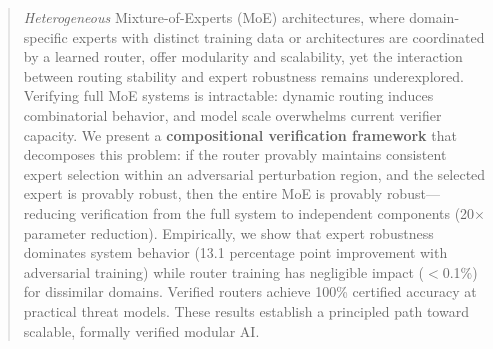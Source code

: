 \documentclass{article}
\theoremstyle{plain}
\theoremstyle{remark}
\begin{document}

\printAffiliationsAndNotice{}

\begin{abstract}
\textit{Heterogeneous} Mixture-of-Experts (MoE) architectures, where domain-specific experts with distinct training data or architectures are coordinated by a learned router, offer modularity and scalability, yet the interaction between routing stability and expert robustness remains underexplored. Verifying full MoE systems is intractable: dynamic routing induces combinatorial behavior, and model scale overwhelms current verifier capacity. We present a \textbf{compositional verification framework} that decomposes this problem: if the router provably maintains consistent expert selection within an adversarial perturbation region, and the selected expert is provably robust, then the entire MoE is provably robust---reducing verification from the full system to independent components (20$\times$ parameter reduction). Empirically, we show that expert robustness dominates system behavior (13.1 percentage point improvement with adversarial training) while router training has negligible impact ($<$0.1\%) for dissimilar domains. Verified routers achieve 100\% certified accuracy at practical threat models. These results establish a principled path toward scalable, formally verified modular AI.
\end{abstract}
\end{document}
